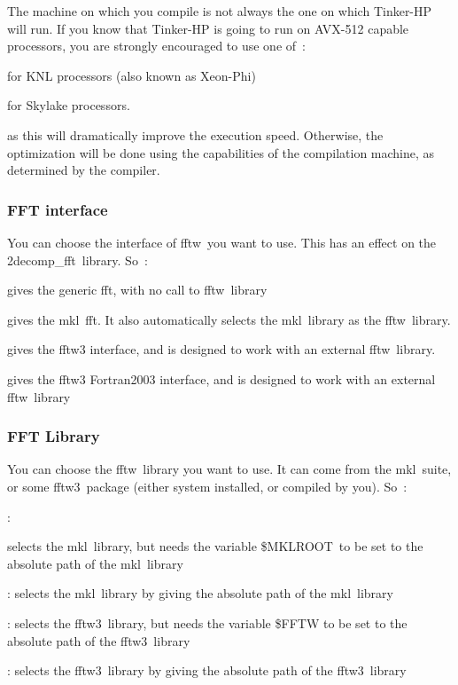 The machine on which you compile is not always the one on which Tinker-\/\-H\-P will run. If you know that Tinker-\/\-H\-P is going to run on A\-V\-X-\/512 capable processors, you are strongly encouraged to use one of \-:


\begin{DoxyItemize}
\item for K\-N\-L processors (also known as Xeon-\/\-Phi)
\item for Skylake processors.
\end{DoxyItemize}

as this will dramatically improve the execution speed. Otherwise, the optimization will be done using the capabilities of the compilation machine, as determined by the compiler.

\subsubsection*{F\-F\-T interface}

You can choose the interface of fftw you want to use. This has an effect on the 2decomp\-\_\-fft library. So \-:


\begin{DoxyItemize}
\item gives the generic fft, with no call to fftw library
\item gives the mkl fft. It also automatically selects the mkl library as the fftw library.
\item gives the fftw3 interface, and is designed to work with an external fftw library.
\item gives the fftw3 Fortran2003 interface, and is designed to work with an external fftw library
\end{DoxyItemize}

\subsubsection*{F\-F\-T Library}

You can choose the fftw library you want to use. It can come from the mkl suite, or some fftw3 package (either system installed, or compiled by you). So \-:


\begin{DoxyItemize}
\item \-: 

 selects the mkl library, but needs the variable {\ttfamily \$\-M\-K\-L\-R\-O\-O\-T} to be set to the absolute path of the mkl library 
\item \-:  selects the mkl library by giving the absolute path of the mkl library 
\item \-:  selects the fftw3 library, but needs the variable {\ttfamily \$\-F\-F\-T\-W} to be set to the absolute path of the fftw3 library 
\item \-:  selects the fftw3 library by giving the absolute path of the fftw3 library 
\end{DoxyItemize}

